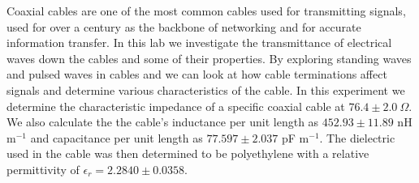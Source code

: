 Coaxial cables are one of the most common cables used for transmitting signals, used for over a century as the backbone of networking and for accurate information transfer. In this lab we investigate the transmittance of electrical waves down the cables and some of their properties. By exploring standing waves and pulsed waves in cables and we can look at how cable terminations affect signals and determine various characteristics of the cable. In this experiment we determine the characteristic impedance of a specific coaxial cable at $76.4\pm2.0\ \Omega $. We also calculate the the cable's inductance per unit length as $452.93\pm11.89$ nH m$^{-1}$ and capacitance per unit length as $77.597\pm2.037$ pF m$^{-1}$. The dielectric used in the cable was then determined to be polyethylene with a relative permittivity of $\epsilon_r = 2.2840 \pm 0.0358 $.